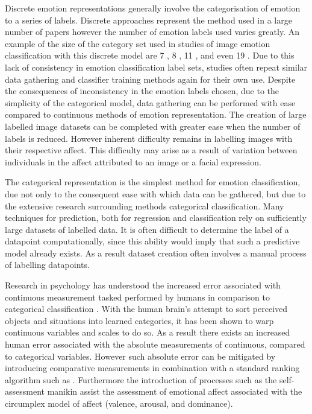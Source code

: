 \documentclass{article}
\begin{document}
Discrete emotion representations generally involve the categorisation of emotion to a series of labels.
Discrete approaches represent the method used in a large number of papers \citep{machajdik2010affective,ali2017emotional,wangarttalk,mohammad2018wikiart} however the number of emotion labels used varies greatly.
An example of the size of the category set used in studies of image emotion classification with this discrete model are 7 \citep{ali2017emotional}, 8 \citep{machajdik2010affective}, 11 \citep{wangarttalk}, and even 19 \citep{mohammad2018wikiart}.
Due to this lack of consistency in emotion classification label sets, studies often repeat similar data gathering and classifier training methods again for their own use.
Despite the consequences of inconsistency in the emotion labels chosen, due to the simplicity of the categorical model, data gathering can be performed with ease compared to continuous methods of emotion representation.
The creation of large labelled image datasets can be completed with greater ease when the number of labels is reduced.
However inherent difficulty remains in labelling images with their respective affect.
This difficulty may arise as a result of variation between individuals in the affect attributed to an image or a facial expression.

The categorical representation is the simplest method for emotion classification, due not only to the consequent ease with which data can be gathered, but due to the extensive research surrounding methods categorical classification.
Many techniques for prediction, both for regression and classification rely on sufficiently large datasets of labelled data.
It is often difficult to determine the label of a datapoint computationally, since this ability would imply that such a predictive model already exists.
As a result dataset creation often involves a manual process of labelling datapoints.

Research in psychology has understood the increased error associated with continuous measurement tasked performed by humans in comparison to categorical classification \citep{harnad2003categorical}.
With the human brain's attempt to sort perceived objects and situations into learned categories, it has been shown to warp continuous variables and scales to do so.
As a result there exists an increased human error associated with the absolute measurements of continuous, compared to categorical variables.
However such absolute error can be mitigated by introducing comparative measurements in combination with a standard ranking algorithm such as \citet{glickman2012example,glickman1995glicko}.
Furthermore the introduction of processes such as the self-assessment manikin \citep{lang1980behavioral} assist the assessment of emotional affect associated with the circumplex model of affect (valence, arousal, and dominance).
\end{document}
